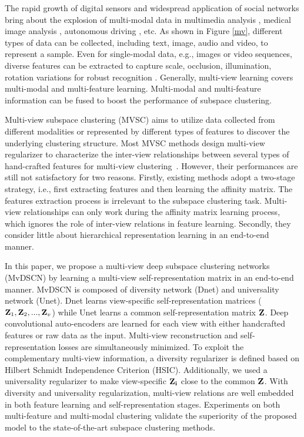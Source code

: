 \documentclass[journal]{IEEEtran}
\begin{document}
The rapid growth of digital sensors and widespread application of social networks bring about the explosion of multi-modal data in multimedia analysis \cite{luo2017simple}, medical image analysis \cite{kim2015dasc}, autonomous driving \cite{chen2017multi}, etc.
As shown in Figure \ref{mv}, different types of data can be collected, including text, image, audio and video, to represent a sample.
Even for single-modal data, e.g., images or video sequences, diverse features can be extracted to capture scale, occlusion, illumination, rotation variations for robust recognition \cite{Zhao2017MultiViewCV}.
Generally, multi-view learning covers multi-modal and multi-feature learning.
Multi-modal and multi-feature information can be fused to boost the performance of subspace clustering.

Multi-view subspace clustering (MVSC) aims to utilize data collected from different modalities or represented by different types of features to discover the underlying clustering structure.
Most MVSC methods design multi-view regularizer to characterize the inter-view relationships between several types of hand-crafted features for multi-view clustering~\cite{Cui2007NonredundantMC,Gnnemann2012MultiviewCU,Wang2015RobustSC,Zhang2017LatentMS,Xu2016DiscriminativelyEK,Zhao2017MultiViewCV,Wang2018PartialMC}.
However, their performances are still not satisfactory for two reasons.
Firstly, existing methods adopt a two-stage strategy, i.e., first extracting features and then learning the affinity matrix. The features extraction process is irrelevant to the subspace clustering task.
Multi-view relationships can only work during the affinity matrix learning process, which ignores the role of inter-view relations in feature learning.
Secondly, they consider little about hierarchical representation learning in an end-to-end manner.

In this paper, we propose a multi-view deep subspace clustering networks (MvDSCN) by learning a multi-view self-representation matrix in an end-to-end manner.
MvDSCN is composed of diversity network (Dnet) and universality network (Unet).
Dnet learns view-specific self-representation matrices (${\bf{Z}}_1, {\bf{Z}}_2,...,{\bf{Z}}_v$) while Unet learns a common self-representation matrix $\bf{Z}$.
Deep convolutional auto-encoders are learned for each view with either handcrafted features or raw data as the input.
Multi-view reconstruction and self-representation losses are simultaneously minimized.
To exploit the complementary multi-view information, a diversity regularizer is defined based on Hilbert Schmidt Independence Criterion (HSIC).
Additionally, we used a universality regularizer to make view-specific $\bf{Z}_i$ close to the common $\bf{Z}$.
With diversity and universality regularization, multi-view relations are well embedded in both feature learning and self-representation stages.
Experiments on both multi-feature and multi-modal clustering validate the superiority of the proposed model to the state-of-the-art subspace clustering methods.
\end{document}
